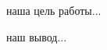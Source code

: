 \documentclass[12pt,a4paper]{article}
\begin{document}
\maketitle



\labheading



\begin{labgoal}
наша цель работы...
\end{labgoal}



\labreport




\begin{labconclusion}
наш вывод...
\end{labconclusion}
\end{document}
